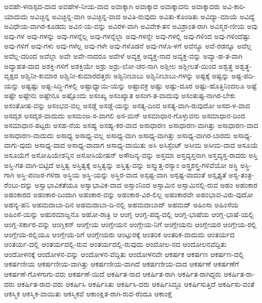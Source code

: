 {ಅವಹೇ-ಳನಾಸ್ಪದ-ವಾದ
ಅವಹೇಳ-ನೀಯ-ವಾದ
ಅವಾಕ್ಕಾಗಿ
ಅವಾಕ್ಕಾದ
ಅವಾಕ್ಕಾದನು
ಅವಾಕ್ಕಾದರು
ಅವಿ-ಕಾರಿ-ಯಾದುದು
ಅವಿಚ್ಛಿನ್ನ
ಅವಿಚ್ಛಿನ್ನ-ವಾಗಿ
ಅವಿಚ್ಛಿನ್ನ-ವಾದ
ಅವಿತಿ-ರುವುದು
ಅವಿತು-ಕೊಂಡಿತು
ಅವಿದ್ಯಾ-ಮಾಯೆ
ಅವಿದ್ಯೆ
ಅವಿಧೇಯ-ವಾಗಿರ-ಕೂಡದು
ಅವಿನ-ಯ-ವನ್ನು
ಅವಿರಳ-ವಾಗಿ
ಅವಿವೇಕ-ತನ
ಅವಿಶ್ರಾಂತ-ರಾಗಿ
ಅವಿಸ್ಮರ-ಣೀಯ
ಅವು
ಅವು-ಗಳ
ಅವು-ಗಳನ್ನು
ಅವು-ಗಳನ್ನೆಲ್ಲ
ಅವು-ಗಳನ್ನೆಲ್ಲಾ
ಅವು-ಗಳನ್ನೇ
ಅವು-ಗಳಲ್ಲಿ
ಅವು-ಗಳಿಂದ
ಅವು-ಗಳಿಂದೆಷ್ಟು
ಅವು-ಗಳಿಗೆ
ಅವು-ಗಳು
ಅವು-ಗಳೆಲ್ಲ
ಅವು-ಗಳೇ
ಅವು-ಗಳೊಡನೆ
ಅವು-ಗಳೊ-ಳಗೆ
ಅವೆನ್ಯೂ
ಅವೆ-ರಡನ್ನೂ
ಅವೆಲ್ಲ
ಅವೆಲ್ಲ-ದರಿಂದ
ಅವೆಲ್ಲಾ
ಅವೇ
ಅವೇ-ನಾದರೂ
ಅವೇಳೆ
ಅವ್ಯಕ್ತ
ಅವ್ಯಕ್ತ-ನಾದ
ಅವ್ಯಕ್ತ-ವನ್ನು
ಅವ್ಯಾ-ಹ-ತ-ವಾಗಿ
ಅವ್ಯಾಹತ-ವಾದ
ಅಶಕ್ತಿ-ಗಳಿಗೆ
ಅಶಕ್ತಿಯೇ
ಅಶ್ರು
ಅಶ್ರು-ಲೋ-ಚನ-ನಾಗಿ
ಅಶ್ಲೀಲ
ಅಶ್ಲೀಲತೆ-ಯಿಂದ
ಅಶ್ವತ್ಥ
ಅಶ್ವತ್ಥ-ವೃಕ್ಷದ
ಅಶ್ವಿನೀ-ಕುಮಾರ
ಅಶ್ವಿನೀ-ಕುಮಾರದತ್ತರು
ಅಶ್ವಿನೀಬಾಬು
ಅಶ್ವಿನೀಬಾಬು-ಗಳನ್ನು
ಅಷ್ಟಕ್ಕೆ
ಅಷ್ಟನ್ನು
ಅಷ್ಟ-ಪದಿ-ಯನ್ನು
ಅಷ್ಟಷ್ಟು
ಅಷ್ಟ-ಸಿದ್ಧಿ-ಗಳಲ್ಲಿ
ಅಷ್ಟಾಧ್ಯಾಯಿ-ಯನ್ನು
ಅಷ್ಟಾವಕ್ರ
ಅಷ್ಟು
ಅಷ್ಟು-ದೂರ
ಅಷ್ಟು-ಹೊತ್ತಿನಿಂದಲೂ
ಅಷ್ಟೆ
ಅಷ್ಟೇ
ಅಷ್ಟೇನು
ಅಷ್ಟೇನೂ
ಅಷ್ಟೊಂದು
ಅಸಂಖ್ಯ
ಅಸಂಖ್ಯಾತ
ಅಸಂಗ-ತ-ವಾದುವು
ಅಸಂತುಷ್ಟ-ನಾಗಿರ-ಬೇಕು
ಅಸಂತೋಷ-ವನ್ನು
ಅಸಂಭವ-ವಲ್ಲ
ಅಸಡ್ಡೆ
ಅಸಡ್ಡೆ-ಯನ್ನು
ಅಸತ್ಯ-ದಿಂದ
ಅಸತ್ಯ-ವಾಗಿ-ರುವುದೋ
ಅಸದ-ಳ-ವಾದ
ಅಸದೃಶ
ಅಸದೃಶ-ವಾದುದು
ಅಸಮಂಜ-ಸ-ವಾಗಲಿ
ಅಸ-ಮನ್
ಅಸಮಾಧಾನ-ಗೊಳ್ಳುವನು
ಅಸಮಾಧಾನ-ದಿಂದ
ಅಸಮಾಧಾನ-ಪಟ್ಟರು
ಅಸಹ-ನೆಯ
ಅಸಹ್ಯ
ಅಸಹ್ಯ-ಕರ-ವಾದ
ಅಸಾಧಾರಣ
ಅಸಾಧಾರಣ-ವಾಗಿತ್ತು
ಅಸಾಧಾರಣ-ವಾದ
ಅಸಾಧಾರಣ-ವಾದುದು
ಅಸಾಧ್ಯ
ಅಸಾಧ್ಯ-ವಲ್ಲ
ಅಸಾಧ್ಯ-ವಾಗಿ
ಅಸಾಧ್ಯ-ವಾಗಿತ್ತು
ಅಸಾಧ್ಯ-ವಾಗಿರ-ಬಾರದು
ಅಸಾಧ್ಯ-ವಾಗು-ವುದು
ಅಸಾಧ್ಯ-ವಾದ
ಅಸಾಧ್ಯ-ವಾದಾಗ
ಅಸಾಧ್ಯ-ವಾಯಿತು
ಅಸಿ
ಅಸಿಸ್ಟೆಂಟ್
ಅಸೀಮ
ಅಸೀಮ-ವಾದ
ಅಸೂಯೆ
ಅಸೂಯೆಗೆ
ಅಸೋಷಿಯೇಶನ್ನಿನ
ಅಸೋಸಿಯೇಷನ್
ಅಸೌಜನ್ಯ-ವನ್ನು
ಅಸ್ತಮಾ
ಅಸ್ತವ್ಯಸ್ತನಾಗಿ
ಅಸ್ತವ್ಯಸ್ತ-ರಾದರು
ಅಸ್ತಿ
ಅಸ್ತಿ-ಗತ-ವಾಗಿ-ಬಿಟ್ಟಿದೆ
ಅಸ್ತಿತ್ವ
ಅಸ್ತಿತ್ವಕ್ಕೆ
ಅಸ್ತಿತ್ವನ್ನು
ಅಸ್ತಿತ್ವ-ವನ್ನು
ಅಸ್ತ್ಯುತ್ತ-ರಸ್ಯಾಂ
ಅಸ್ತ್ರಶಸ್ತ್ರ-ಗಳಿವೆಯೋ
ಅಸ್ಥಿ
ಅಸ್ಥಿ-ಗಾಗಿ
ಅಸ್ಥಿ-ಪಂಜರ-ಗಳಿರಾ
ಅಸ್ಥಿಯ
ಅಸ್ಥಿ-ಯನ್ನು
ಅಸ್ಥಿರ-ವಾದ
ಅಸ್ಪಷ್ಟ-ವಾಗಿ
ಅಸ್ಪಷ್ಟ-ವಾದಂತೆ
ಅಸ್ಪೃಶ್ಯತೆ
ಅಸ್ವ-ತಂತ್ರ-ರೆಂಬು-ದನ್ನು
ಅಸ್ವಾಭಾವಿಕತೆಯೂ
ಅಸ್ವಾಭಾವಿಕ-ವಾದ
ಅಸ್ಸಾಂನಿಂದ
ಅಸ್ಸಾಮಿನ
ಅಸ್ಸಾಮಿನಲ್ಲಿ-ರುವ
ಅಹಂ
ಅಹಂಕಾರ
ಅಹಂಕಾರದ
ಅಹಂಕಾರ-ದಿಂದಾಗಿ
ಅಹಂಕಾರ-ವನ್ನು
ಅಹಂಕಾರ-ವಿರ-ಲಿಲ್ಲ
ಅಹಂಕಾರವೇ
ಅಹಂಭಾವ-ವಿರು-ವುದೋ
ಅಹನ್ಯ-ಹನಿ
ಅಹಮದಾಬಾ-ದಿನ
ಅಹಮದಾಬಾ-ದಿ-ನಲ್ಲಿ
ಅಹಮದಾಬಾದ್
ಅಹಮದ್
ಅಹಿಂಸಾ
ಅಹಿಂಸೆಯ
ಅಹಿಂಸೆ-ಯನ್ನು
ಅಹುರಮಾಜ್ದನೊ
ಅಹೋ-ರಾತ್ರಿ
ಆ
ಆಂಗ್ಲ
ಆಂಗ್ಲ-ಪದ್ಯ-ದಲ್ಲಿ
ಆಂಗ್ಲ-ಭಾಷೆಯ
ಆಂಗ್ಲ-ಭಾಷೆ-ಯಲ್ಲಿ
ಆಂಗ್ಲ-ಸರ್ಕಾರ-ವನ್ನು
ಆಂಗ್ಲಿಕನ್
ಆಂಗ್ಲೇಯ
ಆಂಗ್ಲೇಯನ
ಆಂಗ್ಲೇಯ-ನಿಗೆ
ಆಂಗ್ಲೇಯನು
ಆಂಗ್ಲೇಯರ
ಆಂಗ್ಲೇಯ-ರಲ್ಲಿ
ಆಂಗ್ಲೇಯ-ರಲ್ಲಿಯೂ
ಆಂಗ್ಲೇಯ-ರಿಗೆ
ಆಂಗ್ಲೇಯರು
ಆಂಟ್ಪುರಕ್ಕೆ
ಆಂತರಿಕ
ಆಂತರಿಕ-ವಾದುದು
ಆಂತರ್ಯದ
ಆಂತರ್ಯ-ದಲ್ಲಿ
ಆಂತರ್ಯದಲ್ಲಿ-ರುವ
ಆಂತರ್ಯದಲ್ಲಿ-ರುವುದು
ಆಂದೋಲ-ನದ
ಆಂದೋಲನವೆದ್ದಿತು
ಆಂದೋಳನಕ್ಕೆ
ಆಂದೋಳನ-ವನ್ನು
ಆಂದೋಳನ-ವೆದ್ದಿತು
ಆಂದೋಳನವೇ
ಆಕರ್ಷಕ
ಆಕರ್ಷಣ
ಆಕರ್ಷಣ-ದಲ್ಲಿ
ಆಕರ್ಷಣೀಯ
ಆಕರ್ಷಣೀಯ-ವಾಗಿತ್ತು
ಆಕರ್ಷಣೀಯ-ವಾಗಿದೆ
ಆಕರ್ಷಣೀಯ-ವಾದ
ಆಕರ್ಷಣೆ
ಆಕರ್ಷಣೆಗೆ
ಆಕರ್ಷಣೆ-ಗೊಳಗಾಗು-ವರು
ಆಕರ್ಷಣೆ-ಯಿದೆ
ಆಕರ್ಷಿತ-ನಾದ
ಆಕರ್ಷಿತ-ರಾಗಿ
ಆಕರ್ಷಿತ-ರಾಗಿದ್ದರು
ಆಕರ್ಷಿತ-ರಾ-ದರು
ಆಕರ್ಷಿತ-ರಾದ-ವರು
ಆಕರ್ಷಿಸಿ
ಆಕರ್ಷಿಸಿತು
ಆಕರ್ಷಿಸಿ-ದರು
ಆಕರ್ಷಿಸಿದ್ದೂ
ಆಕರ್ಷಿಸುತ್ತಿದೆ
ಆಕರ್ಷಿಸು-ವಂತೆ
ಆಕಸ್ಮಿಕ
ಆಕಸ್ಮಿಕ-ವಾಯಿತು
ಆಕಸ್ಮಿಕವೆ
ಆಕಾಂಕ್ಷಿತ-ರಾಗಿ-ರುವ-ರೆಂದೂ
ಆಕಾಂಕ್ಷೆ
}
